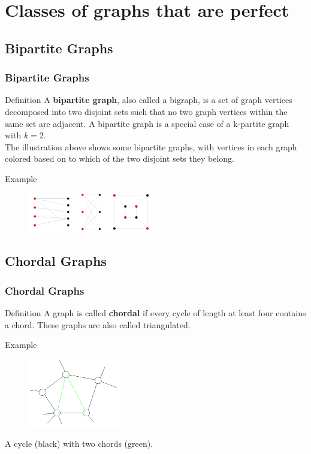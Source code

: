 \documentclass{beamer}
\begin{document}
\section{Classes of graphs that are perfect}
\subsection{Bipartite Graphs}
\begin{frame}\frametitle{Bipartite Graphs}
\begin{block}{Definition}
A \textbf{bipartite graph}, also called a bigraph, is a set of graph vertices decomposed into two disjoint sets such that no two graph vertices within the same set are adjacent. A bipartite graph is a special case of a k-partite graph with $k=2$. \\
The illustration above shows some bipartite graphs, with vertices in each graph colored based on to which of the two disjoint sets they belong.
\end{block}
\begin{exampleblock}{Example}
\begin{figure}[h]
\includegraphics[width=5.5cm]{picture1}
\end{figure}
\end{exampleblock}
\end{frame}

\subsection{Chordal Graphs}
\begin{frame}\frametitle{Chordal Graphs}
\begin{block}{Definition}
A graph is called \textbf{chordal} if every cycle of length at least four contains a chord. These graphs are also called triangulated.
\end{block}
\begin{exampleblock}{Example}
\begin{figure}[h]
\includegraphics[width=4cm]{picture2}
\end{figure}
A cycle (black) with two chords (green).
\end{exampleblock}
\end{frame}
\end{document}
